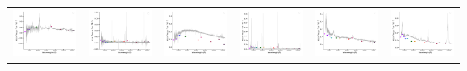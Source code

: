\begin{center}
\begin{longtable}{l l l l l l }
    \includegraphics[width=0.3\linewidth, clip]{Figs/Figs-sdss/spec-7868-57006-0691-STRIPE82-0014-014477.pdf} & \includegraphics[width=0.3\linewidth, clip]{Figs/Figs-sdss/spec-7870-57016-0292-STRIPE82-0017-021131.pdf} & \includegraphics[width=0.3\linewidth, clip]{Figs/Figs-sdss/spec-9144-57666-0046-SPLUS-s02s04-008782.pdf} & \includegraphics[width=0.3\linewidth, clip]{Figs/Figs-sdss/spec-9144-57666-0109-STRIPE82-0127-008619.pdf} & \includegraphics[width=0.3\linewidth, clip]{Figs/Figs-sdss/spec-9145-58041-0210-SPLUS-s02s05-026507.pdf} & \includegraphics[width=0.3\linewidth, clip]{Figs/Figs-sdss/spec-9146-58042-0345-SPLUS-s02s07-034127.pdf} \\

\end{longtable}
\end{center}
